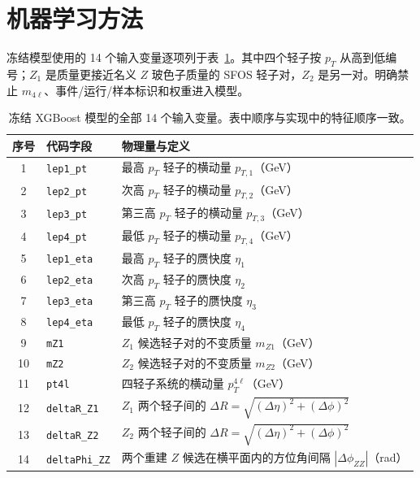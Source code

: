 \documentclass[11pt,a4paper,fontset=none]{ctexart}
\begin{document}
\section{机器学习方法}

冻结模型使用的 14 个输入变量逐项列于表~\ref{tab:model-features}。其中四个轻子按 $p_T$ 从高到低编号；$Z_1$ 是质量更接近名义 $Z$ 玻色子质量的 SFOS 轻子对，$Z_2$ 是另一对。明确禁止 $m_{4\ell}$、事件/运行/样本标识和权重进入模型。

\begin{table}[H]
\centering
\caption{冻结 XGBoost 模型的全部 14 个输入变量。表中顺序与实现中的特征顺序一致。}
\label{tab:model-features}
\small
\begin{tabularx}{\textwidth}{@{}clX@{}}
\toprule
序号 & 代码字段 & 物理量与定义 \\
\midrule
1  & \texttt{lep1\_pt}      & 最高 $p_T$ 轻子的横动量 $p_{T,1}$（GeV） \\
2  & \texttt{lep2\_pt}      & 次高 $p_T$ 轻子的横动量 $p_{T,2}$（GeV） \\
3  & \texttt{lep3\_pt}      & 第三高 $p_T$ 轻子的横动量 $p_{T,3}$（GeV） \\
4  & \texttt{lep4\_pt}      & 最低 $p_T$ 轻子的横动量 $p_{T,4}$（GeV） \\
5  & \texttt{lep1\_eta}     & 最高 $p_T$ 轻子的赝快度 $\eta_1$ \\
6  & \texttt{lep2\_eta}     & 次高 $p_T$ 轻子的赝快度 $\eta_2$ \\
7  & \texttt{lep3\_eta}     & 第三高 $p_T$ 轻子的赝快度 $\eta_3$ \\
8  & \texttt{lep4\_eta}     & 最低 $p_T$ 轻子的赝快度 $\eta_4$ \\
9  & \texttt{mZ1}           & $Z_1$ 候选轻子对的不变质量 $m_{Z1}$（GeV） \\
10 & \texttt{mZ2}           & $Z_2$ 候选轻子对的不变质量 $m_{Z2}$（GeV） \\
11 & \texttt{pt4l}          & 四轻子系统的横动量 $p_T^{4\ell}$（GeV） \\
12 & \texttt{deltaR\_Z1}    & $Z_1$ 两个轻子间的 $\Delta R=\sqrt{(\Delta\eta)^2+(\Delta\phi)^2}$ \\
13 & \texttt{deltaR\_Z2}    & $Z_2$ 两个轻子间的 $\Delta R=\sqrt{(\Delta\eta)^2+(\Delta\phi)^2}$ \\
14 & \texttt{deltaPhi\_ZZ}  & 两个重建 $Z$ 候选在横平面内的方位角间隔 $|\Delta\phi_{ZZ}|$（rad） \\
\bottomrule
\end{tabularx}
\end{table}
\end{document}
